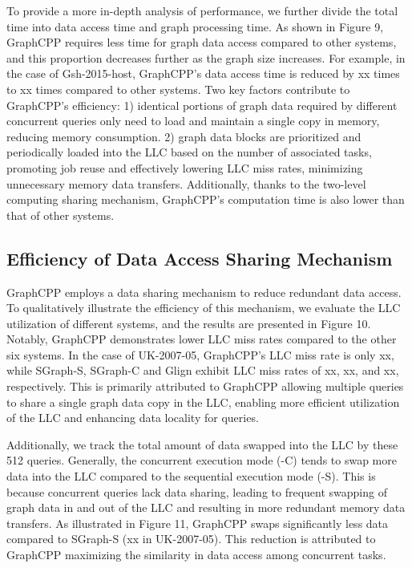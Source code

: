 \documentclass[lettersize,journal]{IEEEtran} %
\begin{document}
To provide a more in-depth analysis of performance, we further divide the total time into data access time and graph processing time. As shown in Figure 9, GraphCPP requires less time for graph data access compared to other systems, and this proportion decreases further as the graph size increases. For example, in the case of Gsh-2015-host, GraphCPP's data access time is reduced by xx times to xx times compared to other systems. Two key factors contribute to GraphCPP's efficiency: 1) identical portions of graph data required by different concurrent queries only need to load and maintain a single copy in memory, reducing memory consumption. 2) graph data blocks are prioritized and periodically loaded into the LLC based on the number of associated tasks, promoting job reuse and effectively lowering LLC miss rates, minimizing unnecessary memory data transfers. Additionally, thanks to the two-level computing sharing mechanism, GraphCPP's computation time is also lower than that of other systems.

\subsection{Efficiency of Data Access Sharing Mechanism}
GraphCPP employs a data sharing mechanism to reduce redundant data access. To qualitatively illustrate the efficiency of this mechanism, we evaluate the LLC utilization of different systems, and the results are presented in Figure 10. Notably, GraphCPP demonstrates lower LLC miss rates compared to the other six systems. In the case of UK-2007-05, GraphCPP's LLC miss rate is only xx, while SGraph-S, SGraph-C and Glign exhibit LLC miss rates of xx, xx, and xx, respectively. This is primarily attributed to GraphCPP allowing multiple queries to share a single graph data copy in the LLC, enabling more efficient utilization of the LLC and enhancing data locality for queries.

Additionally, we track the total amount of data swapped into the LLC by these 512 queries. Generally, the concurrent execution mode (-C) tends to swap more data into the LLC compared to the sequential execution mode (-S). This is because concurrent queries lack data sharing, leading to frequent swapping of graph data in and out of the LLC and resulting in more redundant memory data transfers. As illustrated in Figure 11, GraphCPP swaps significantly less data compared to SGraph-S (xx in UK-2007-05). This reduction is attributed to GraphCPP maximizing the similarity in data access among concurrent tasks.
\end{document}
